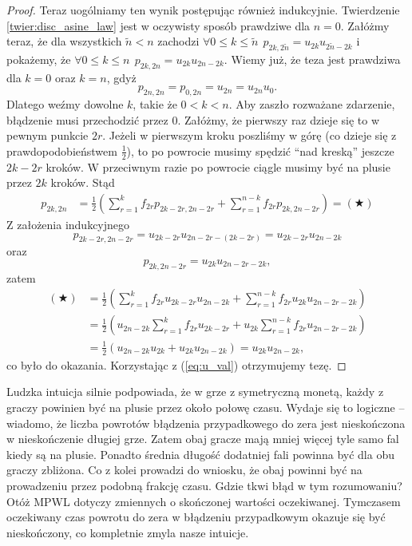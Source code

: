 \documentclass[a4paper,11pt,oneside]{book}
\begin{document}
\begin{proof}
Teraz uogólniamy ten wynik postępując również indukcyjnie. Twierdzenie \ref{twier:disc_asine_law} jest w oczywisty sposób prawdziwe dla $n=0$. Załóżmy teraz, że dla wszystkich $\tilde{n} < n$ zachodzi $\forall 0 \leq k \leq \tilde{n}\ \ p_{2k,2\tilde{n}} = u_{2k} u_{2\tilde{n}-2k}$ i pokażemy, że $\forall 0 \leq k \leq n\ \ p_{2k,2n} = u_{2k} u_{2n-2k}$. 
Wiemy już, że teza jest prawdziwa dla $k = 0$ oraz $k = n$, gdyż
\[  p_{2n,2n} = p_{0,2n} = u_{2n} = u_{2n}u_0. \]
Dlatego weźmy dowolne $k$, takie że $0 < k < n$. Aby zaszło rozważane zdarzenie, błądzenie musi przechodzić przez 0. Załóżmy, że pierwszy raz dzieje się to w pewnym punkcie $2r$. Jeżeli w pierwszym kroku poszliśmy w górę (co dzieje się z prawdopodobieństwem $\frac{1}{2}$), to po powrocie musimy spędzić ``nad kreską'' jeszcze $2k-2r$ kroków. W przeciwnym razie po powrocie ciągle musimy być na plusie przez $2k$ kroków. Stąd
\begin{equation*}
 \begin{split}
  p_{2k,2n} &= \frac{1}{2} \left( \sum_{r=1}^k f_{2r} p_{2k-2r,2n-2r} + \sum_{r=1}^{n-k} f_{2r} p_{2k, 2n-2r} \right) = (\bigstar)
 \end{split}
\end{equation*}
\noindent Z założenia indukcyjnego
\[ p_{2k-2r,2n-2r} = u_{2k-2r}u_{2n-2r - (2k-2r)} = u_{2k-2r}u_{2n-2k} \]
oraz
\[ p_{2k,2n-2r} = u_{2k}u_{2n-2r-2k}, \]
zatem
\begin{equation*}
 \begin{split}
  (\bigstar) &= \frac{1}{2} \left( \sum_{r=1}^k f_{2r} u_{2k-2r}u_{2n-2k} + \sum_{r=1}^{n-k} f_{2r} u_{2k}u_{2n-2r-2k} \right) \\
             &= \frac{1}{2} \left( u_{2n-2k}\sum_{r=1}^k f_{2r} u_{2k-2r} + u_{2k}\sum_{r=1}^{n-k} f_{2r} u_{2n-2r-2k} \right) \\
             &= \frac{1}{2} \left( u_{2n-2k}u_{2k} + u_{2k} u_{2n-2k} \right) = u_{2k} u_{2n-2k},
 \end{split}
\end{equation*}
co było do okazania. Korzystając z (\ref{eq:u_val}) otrzymujemy tezę.
\end{proof}


Ludzka intuicja silnie podpowiada, że w grze z symetryczną monetą, każdy z graczy powinien być na plusie przez około połowę czasu. Wydaje się to logiczne -- wiadomo, że liczba powrotów błądzenia przypadkowego do zera jest nieskończona w nieskończenie długiej grze. Zatem obaj gracze mają mniej więcej tyle samo fal kiedy są na plusie. Ponadto średnia długość dodatniej fali powinna być dla obu graczy zbliżona. Co z kolei prowadzi do wniosku, że obaj powinni być na prowadzeniu przez podobną frakcję czasu. Gdzie tkwi błąd w tym rozumowaniu? Otóż MPWL dotyczy zmiennych o skończonej wartości oczekiwanej. Tymczasem oczekiwany czas powrotu do zera w błądzeniu przypadkowym okazuje się być nieskończony, co kompletnie zmyla nasze intuicje.
\end{document}
